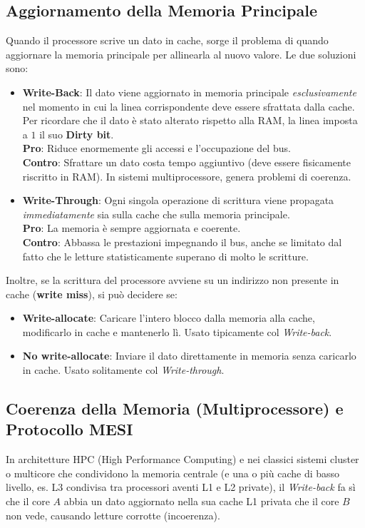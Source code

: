 \subsection{Aggiornamento della Memoria Principale}
Quando il processore scrive un dato in cache, sorge il problema di quando aggiornare la memoria principale per allinearla al nuovo valore.
Le due soluzioni sono:
\begin{itemize}
    \item \textbf{Write-Back}: Il dato viene aggiornato in memoria principale \textit{esclusivamente} nel momento in cui la linea corrispondente deve essere sfrattata dalla cache. Per ricordare che il dato è stato alterato rispetto alla RAM, la linea imposta a $1$ il suo \textbf{Dirty bit}. \\
    \textbf{Pro}: Riduce enormemente gli accessi e l'occupazione del bus.\\
    \textbf{Contro}: Sfrattare un dato costa tempo aggiuntivo (deve essere fisicamente riscritto in RAM). In sistemi multiprocessore, genera problemi di coerenza.
    \item \textbf{Write-Through}: Ogni singola operazione di scrittura viene propagata \textit{immediatamente} sia sulla cache che sulla memoria principale. \\
    \textbf{Pro}: La memoria è sempre aggiornata e coerente.\\
    \textbf{Contro}: Abbassa le prestazioni impegnando il bus, anche se limitato dal fatto che le letture statisticamente superano di molto le scritture.
\end{itemize}

Inoltre, se la scrittura del processore avviene su un indirizzo non presente in cache (\textbf{write miss}), si può decidere se:
\begin{itemize}
    \item \textbf{Write-allocate}: Caricare l'intero blocco dalla memoria alla cache, modificarlo in cache e mantenerlo lì. Usato tipicamente col \textit{Write-back}.
    \item \textbf{No write-allocate}: Inviare il dato direttamente in memoria senza caricarlo in cache. Usato solitamente col \textit{Write-through}.
\end{itemize}

\subsection{Coerenza della Memoria (Multiprocessore) e Protocollo MESI}
In architetture HPC (High Performance Computing) e nei classici sistemi cluster o multicore che condividono la memoria centrale (e una o più cache di basso livello, es. L3 condivisa tra processori aventi L1 e L2 private), il \textit{Write-back} fa sì che il core $A$ abbia un dato aggiornato nella sua cache L1 privata che il core $B$ non vede, causando letture corrotte (incoerenza).

